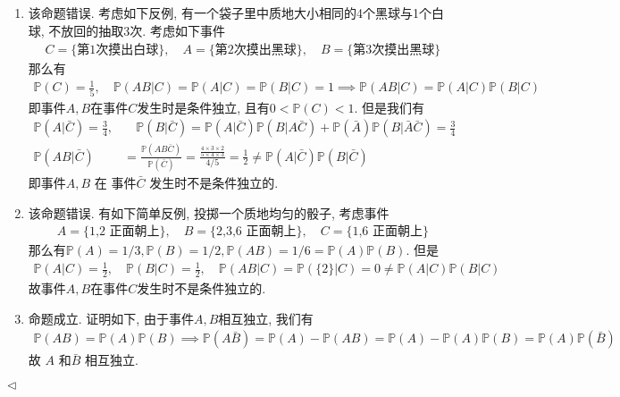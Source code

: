 \documentclass[11pt]{article}
\newenvironment{answer}[1][Solution]{\begin{trivlist}
\item[\hskip \labelsep {\bfseries #1.}\hskip \labelsep]}{\hfill$\lhd$\end{trivlist}}
\newcommand\1{\mathds{1}}
\newcommand\PP{\mathbb{P}}
\begin{document}
\begin{answer}
    \begin{enumerate}[label = (\arabic*)]
        \item 该命题错误. 考虑如下反例, 有一个袋子里中质地大小相同的4个黑球与1个白球, 不放回的抽取3次. 考虑如下事件
        \begin{align*}
            C = \{\text{第1次摸出白球}\}, \quad A = \{\text{第2次摸出黑球}\}, \quad B = \{\text{第3次摸出黑球}\}
        \end{align*}
        那么有\begin{align*}
            \PP(C) = \frac{1}{5}, \quad \PP(AB|C) = \PP(A|C) = \PP(B|C) = 1 \implies \PP(AB|C) = \PP(A|C)\PP(B|C)
        \end{align*}
        即事件$A,B$在事件$C$发生时是条件独立, 且有$0< \PP(C) < 1$. 但是我们有\begin{align*}
            \PP(A|\bar{C}) = \frac{3}{4},&\quad \PP(B|\bar{C}) = \PP(A|\bar{C})\PP(B|A\bar{C}) + \PP(\bar{A})\PP(B|\bar{A}\bar{C}) = \frac{3}{4} \\
            \PP(AB|\bar{C}) &= \frac{\PP(AB\bar{C})}{\PP(\bar{C})} = \frac{\frac{4\times 3\times 2}{5\times 4 \times 3}}{4/5} = \frac{1}{2} \neq  \PP(A|\bar{C})\PP(B|\bar{C})
        \end{align*}
        即事件$A, B$ 在 事件$\bar{C}$ 发生时不是条件独立的.
        \item 该命题错误. 有如下简单反例, 投掷一个质地均匀的骰子, 考虑事件\begin{align*}
            A = \{\text{1,2 正面朝上}\}, \quad B = \{\text{2,3,6 正面朝上}\}, \quad C = \{\text{1,6 正面朝上}\}
        \end{align*}
        那么有$\PP(A) = 1/3, \PP(B) = 1/2, \PP(AB) = 1/6 = \PP(A)\PP(B)$. 但是\begin{align*}
            \PP(A|C) = \frac{1}{2}, \quad \PP(B|C) = \frac{1}{2}, \quad \PP(AB|C) = \PP(\{2\}|C) = 0 \neq \PP(A|C)\PP(B|C)
        \end{align*}
        故事件$A,B$在事件$C$发生时不是条件独立的.
        \item 命题成立. 证明如下, 由于事件$A,B$相互独立, 我们有\begin{align*}
            \PP(AB) = \PP(A)\PP(B) \implies \PP(A\bar{B}) = \PP(A) - \PP(AB) = \PP(A) - \PP(A)\PP(B) = \PP(A)\PP(\bar{B}) 
        \end{align*}
        故 $A$ 和$\bar{B}$ 相互独立.
    \end{enumerate}
\end{answer}
\end{document}

